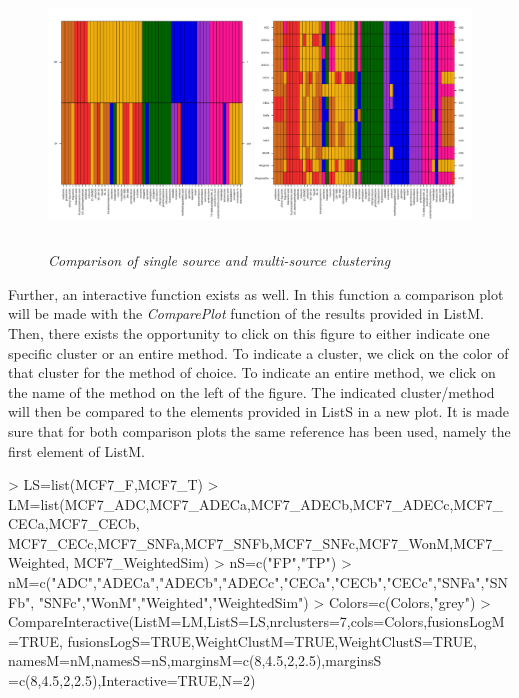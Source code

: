 \documentclass[a4paper]{article}
\begin{document}
\begin{figure}[H]  
\centering
\includegraphics[width=14cm,height=7cm]{CompareSvsM.pdf}
\caption{{\it Comparison of single source and multi-source
clustering}\label{MCF7_SvsM}}
\end{figure}
\noindent Further, an interactive function exists as well. In this function a
comparison plot will be made with the {\it ComparePlot} function of the results
provided in ListM. Then, there exists the opportunity to click on this figure to
either indicate one specific cluster or an entire method. To indicate a cluster,
we click on the color of that cluster for the method of choice. To indicate an
entire method, we click on the name of the method on the left of the figure.
The indicated cluster/method will then be compared to the elements provided in
ListS in a new plot. It is made sure that for both comparison plots the same
reference has been used, namely the first element of ListM.
\begin{Schunk}
\begin{Sinput}
> LS=list(MCF7_F,MCF7_T)
> LM=list(MCF7_ADC,MCF7_ADECa,MCF7_ADECb,MCF7_ADECc,MCF7_CECa,MCF7_CECb,
 		MCF7_CECc,MCF7_SNFa,MCF7_SNFb,MCF7_SNFc,MCF7_WonM,MCF7_Weighted,
 		MCF7_WeightedSim)
> nS=c("FP","TP")
> nM=c("ADC","ADECa","ADECb","ADECc","CECa","CECb","CECc","SNFa","SNFb",
 		"SNFc","WonM","Weighted","WeightedSim")
> Colors=c(Colors,"grey")
> CompareInteractive(ListM=LM,ListS=LS,nrclusters=7,cols=Colors,fusionsLogM=TRUE,
                    fusionsLogS=TRUE,WeightClustM=TRUE,WeightClustS=TRUE,
                    namesM=nM,namesS=nS,marginsM=c(8,4.5,2,2.5),marginsS
                    =c(8,4.5,2,2.5),Interactive=TRUE,N=2)
\end{Sinput}
\end{Schunk}
\newpage
\end{document}
